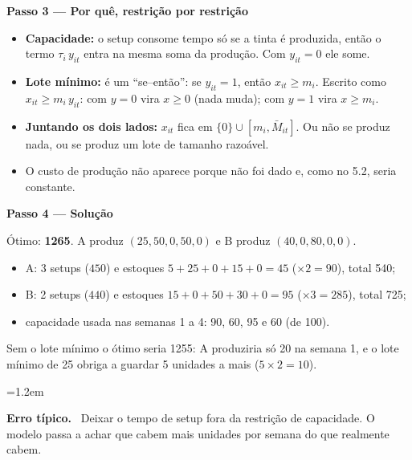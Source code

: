 \documentclass[11pt,a4paper]{article}
\newcommand{\passo}[1]{\par\medskip\textbf{#1}\par}
\newenvironment{nota}[1]{\par\smallskip\begin{list}{}{\leftmargin=1.2em\rightmargin=0pt}\item[]\textbf{#1.}\ }{\end{list}}
\begin{document}
\passo{Passo 3 --- Por quê, restrição por restrição}
\begin{itemize}
  \item \textbf{Capacidade:} o setup consome tempo só se a tinta é produzida, então o termo $\tau_i\,y_{it}$ entra na
        mesma soma da produção. Com $y_{it}=0$ ele some.
  \item \textbf{Lote mínimo:} é um ``se--então'': se $y_{it}=1$, então $x_{it}\ge m_i$. Escrito como $x_{it}\ge m_i\,y_{it}$: com
        $y=0$ vira $x\ge0$ (nada muda); com $y=1$ vira $x\ge m_i$.
  \item \textbf{Juntando os dois lados:} $x_{it}$ fica em $\{0\}\cup[m_i,\bar M_{it}]$. Ou não se produz nada, ou se produz
        um lote de tamanho razoável.
  \item O custo de produção não aparece porque não foi dado e, como no 5.2, seria constante.
\end{itemize}

\passo{Passo 4 --- Solução}
Ótimo: \textbf{1265}. A produz $(25, 50, 0, 50, 0)$ e B produz $(40, 0, 80, 0, 0)$.
\begin{itemize}
  \item A: 3 setups ($450$) e estoques $5+25+0+15+0=45$ ($\times2=90$), total 540;
  \item B: 2 setups ($440$) e estoques $15+0+50+30+0=95$ ($\times3=285$), total 725;
  \item capacidade usada nas semanas 1 a 4: 90, 60, 95 e 60 (de 100).
\end{itemize}
Sem o lote mínimo o ótimo seria 1255: A produziria só 20 na semana 1, e o lote mínimo de 25 obriga a guardar 5
unidades a mais ($5\times2=10$).

\begin{nota}{Erro típico}
Deixar o tempo de setup fora da restrição de capacidade. O modelo passa a achar que cabem mais unidades por semana do que
realmente cabem.
\end{nota}

\clearpage
\end{document}
